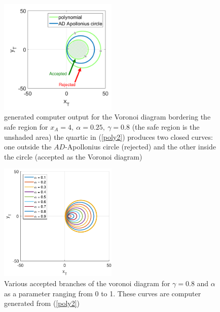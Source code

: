 \documentclass{beamer}
\begin{document}
\begin{frame}
\frametitle{}

\begin{figure}[htb]
\centering
\includegraphics[width=0.5\textwidth]{fig/marked_circle_curve_g_0p8.pdf}
\caption{generated computer output for the Voronoi diagram bordering the safe region for $x_A=4,\ \alpha=0.25,\ \gamma=0.8$ (the safe region is the unshaded area) the quartic in (\ref{poly2}) produces two closed curves: one outside the $AD$-Apollonius circle (rejected) and the other inside the circle (accepted as the Voronoi diagram)}
\label{gamma=0.8}
\end{figure}
\end{frame}
\begin{frame}
\begin{figure}[htb]
\centering
\includegraphics[width=0.5\textwidth]{fig/VAR_alpha_g_0p8.pdf}
\caption{Various accepted branches of the voronoi diagram for $\gamma=0.8$ and $\alpha$ as a parameter ranging from 0 to 1. These curves are computer generated from (\ref{poly2})}
\label{VAR_alpha_gamma=0.8}
\end{figure}
\end{frame}
\end{document}
